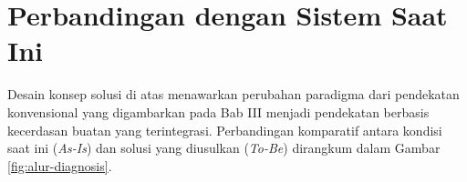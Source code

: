 \section{Perbandingan dengan Sistem Saat Ini}
Desain konsep solusi di atas menawarkan perubahan paradigma dari pendekatan konvensional yang digambarkan pada Bab III menjadi pendekatan berbasis kecerdasan buatan yang terintegrasi. Perbandingan komparatif antara kondisi saat ini (\textit{As-Is}) dan solusi yang diusulkan (\textit{To-Be}) dirangkum dalam Gambar \ref{fig:alur-diagnosis}.


